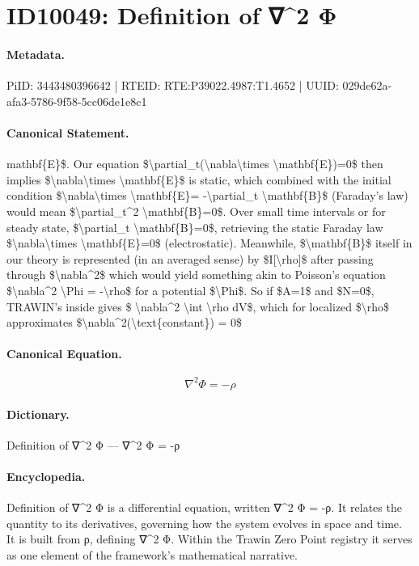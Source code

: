 \section*{ID10049: Definition of ∇\textasciicircum{}2 Φ}
\paragraph{Metadata.}
PiID: 3443480396642 | RTEID: RTE:P39022.4987:T1.4652 | UUID: 029de62a-afa3-5786-9f58-5cc06de1e8c1

\paragraph{Canonical Statement.}
mathbf\{E\}\$. Our equation \$\textbackslash{}partial\_t(\textbackslash{}nabla\textbackslash{}times \textbackslash{}mathbf\{E\})=0\$ then implies \$\textbackslash{}nabla\textbackslash{}times \textbackslash{}mathbf\{E\}\$ is static, which combined with the initial condition \$\textbackslash{}nabla\textbackslash{}times \textbackslash{}mathbf\{E\}= -\textbackslash{}partial\_t \textbackslash{}mathbf\{B\}\$ (Faraday’s law) would mean \$\textbackslash{}partial\_t\textasciicircum{}2 \textbackslash{}mathbf\{B\}=0\$. Over small time intervals or for steady state, \$\textbackslash{}partial\_t \textbackslash{}mathbf\{B\}=0\$, retrieving the static Faraday law \$\textbackslash{}nabla\textbackslash{}times \textbackslash{}mathbf\{E\}=0\$ (electrostatic). Meanwhile, \$\textbackslash{}mathbf\{B\}\$ itself in our theory is represented (in an averaged sense) by \$I[\textbackslash{}rho]\$ after passing through \$\textbackslash{}nabla\textasciicircum{}2\$ which would yield something akin to Poisson’s equation \$\textbackslash{}nabla\textasciicircum{}2 \textbackslash{}Phi = -\textbackslash{}rho\$ for a potential \$\textbackslash{}Phi\$. So if \$A=1\$ and \$N=0\$, TRAWIN’s inside gives \$ \textbackslash{}nabla\textasciicircum{}2 \textbackslash{}int \textbackslash{}rho dV\$, which for localized \$\textbackslash{}rho\$ approximates \$\textbackslash{}nabla\textasciicircum{}2(\textbackslash{}text\{constant\}) = 0\$

\paragraph{Canonical Equation.}
\[
\nabla^2 \Phi = -\rho
\]

\paragraph{Dictionary.}
Definition of ∇\textasciicircum{}2 Φ — ∇\textasciicircum{}2 Φ = -ρ

\paragraph{Encyclopedia.}
Definition of ∇\textasciicircum{}2 Φ is a differential equation, written ∇\textasciicircum{}2 Φ = -ρ. It relates the quantity to its derivatives, governing how the system evolves in space and time. It is built from ρ, defining ∇\textasciicircum{}2 Φ. Within the Trawin Zero Point registry it serves as one element of the framework's mathematical narrative.
